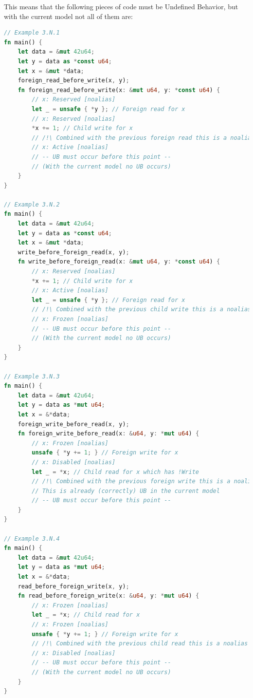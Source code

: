 \documentclass[a4paper,11pt]{article}
\theoremstyle{plain}
\theoremstyle{definition}
\theoremstyle{remark}
\begin{document}
This means that the following pieces of code must be Undefined Behavior,
but with the current model not all of them are:
\begin{lstlisting}[language=rust]
// Example 3.N.1
fn main() {
    let data = &mut 42u64;
    let y = data as *const u64;
    let x = &mut *data;
    foreign_read_before_write(x, y);
    fn foreign_read_before_write(x: &mut u64, y: *const u64) {
        // x: Reserved [noalias]
        let _ = unsafe { *y }; // Foreign read for x
        // x: Reserved [noalias]
        *x += 1; // Child write for x
        // /!\ Combined with the previous foreign read this is a noalias violation
        // x: Active [noalias]
        // -- UB must occur before this point --
        // (With the current model no UB occurs)
    }
}

// Example 3.N.2
fn main() {
    let data = &mut 42u64;
    let y = data as *const u64;
    let x = &mut *data;
    write_before_foreign_read(x, y);
    fn write_before_foreign_read(x: &mut u64, y: *const u64) {
        // x: Reserved [noalias]
        *x += 1; // Child write for x
        // x: Active [noalias]
        let _ = unsafe { *y }; // Foreign read for x
        // /!\ Combined with the previous child write this is a noalias violation
        // x: Frozen [noalias]
        // -- UB must occur before this point --
        // (With the current model no UB occurs)
    }
}

// Example 3.N.3
fn main() {
    let data = &mut 42u64;
    let y = data as *mut u64;
    let x = &*data;
    foreign_write_before_read(x, y);
    fn foreign_write_before_read(x: &u64, y: *mut u64) {
        // x: Frozen [noalias]
        unsafe { *y += 1; } // Foreign write for x
        // x: Disabled [noalias]
        let _ = *x; // Child read for x which has !Write
        // /!\ Combined with the previous foreign write this is a noalias violation
        // This is already (correctly) UB in the current model
        // -- UB must occur before this point --
    }
}

// Example 3.N.4
fn main() {
    let data = &mut 42u64;
    let y = data as *mut u64;
    let x = &*data;
    read_before_foreign_write(x, y);
    fn read_before_foreign_write(x: &u64, y: *mut u64) {
        // x: Frozen [noalias]
        let _ = *x; // Child read for x
        // x: Frozen [noalias]
        unsafe { *y += 1; } // Foreign write for x
        // /!\ Combined with the previous child read this is a noalias violation
        // x: Disabled [noalias]
        // -- UB must occur before this point --
        // (With the current model no UB occurs)
    }
}
\end{lstlisting}
\end{document}
